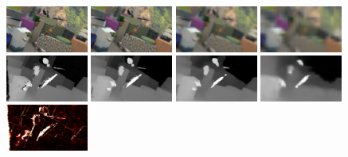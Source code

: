 \documentclass[runningheads]{llncs}
\begin{document}
\begin{figure}
    \begin{center}
        \includegraphics[width=0.24\textwidth,height=0.1\textwidth,clip]{figures/imL_0.png}
        \includegraphics[width=0.24\textwidth,height=0.1\textwidth,clip]{figures/imL_1.png}
        \includegraphics[width=0.24\textwidth,height=0.1\textwidth,clip]{figures/imL_2.png}
        \includegraphics[width=0.24\textwidth,height=0.1\textwidth,clip]{figures/imL_3.png}
        \\
        \includegraphics[width=0.24\textwidth,height=0.1\textwidth,clip]{figures/pred_0.png}
        \includegraphics[width=0.24\textwidth,height=0.1\textwidth,clip]{figures/pred_1.png}
        \includegraphics[width=0.24\textwidth,height=0.1\textwidth,clip]{figures/pred_2.png}
        \includegraphics[width=0.24\textwidth,height=0.1\textwidth,clip]{figures/pred_3.png}
        \\
        \includegraphics[width=0.24\textwidth,height=0.1\textwidth,clip]{figures/pred_0_err.png}

\end{center}
\end{figure}
\end{document}
